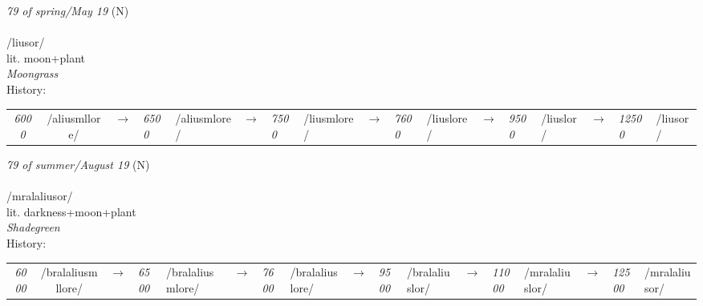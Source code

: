 \vspace{15pt}
\begin{nopagebreak}
 \textit{79 of spring/May 19} (N)\\
\\
\noindent /li{\textprimstress}usor/\\
\noindent lit. moon+plant\\
\noindent \textit{Moongrass}\\


\noindent History:

\vspace{-0pt}
\hspace{40pt}
\begin{tabular}{ccc}
\textit{6000} & /aliusmllore/&$\rightarrow$ & \textit{6500} & /aliusmlore/&$\rightarrow$ & \textit{7500} & /liusmlore/&$\rightarrow$ & \textit{7600} & /liuslore/&$\rightarrow$ & \textit{9500} & /liuslor/&$\rightarrow$ & \textit{12500} & /liusor/& \\
\end{tabular}

\vspace{20pt}\hline

\end{nopagebreak}
\filbreak



\vspace{15pt}
\begin{nopagebreak}
 \textit{79 of summer/August 19} (N)\\
\\
\noindent /mralali{\textprimstress}usor/\\
\noindent lit. darkness+moon+plant\\
\noindent \textit{Shadegreen}\\


\noindent History:

\vspace{-0pt}
\hspace{40pt}
\begin{tabular}{ccc}
\textit{6000} & /bralaliusmllore/&$\rightarrow$ & \textit{6500} & /bralaliusmlore/&$\rightarrow$ & \textit{7600} & /bralaliuslore/&$\rightarrow$ & \textit{9500} & /bralaliuslor/&$\rightarrow$ & \textit{11000} & /mralaliuslor/&$\rightarrow$ & \textit{12500} & /mralaliusor/& \\
\end{tabular}

\vspace{20pt}\hline

\end{nopagebreak}
\filbreak



